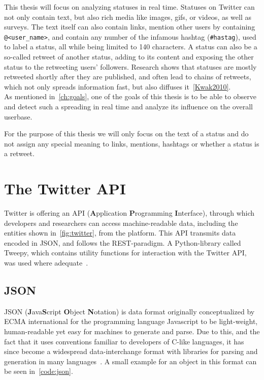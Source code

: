 \par
This thesis will focus on analyzing statuses in real time.
Statuses on Twitter can not only contain text, but also rich media like images, gifs, or videos, as well as surveys.
The text itself can also contain links, mention other users by containing \texttt{@<user_name>},
and contain any number of the infamous hashtag (\texttt{#hastag}), used to label a status, all while being limited to 140 characters.
A status can also be a so-called retweet of another status, adding to its content and exposing the other status to the retweeting users' followers.
Research shows that statuses are mostly retweeted shortly after they are published, and often lead to chains of retweets,
which not only spreads information fast, but also diffuses it~\ref{Kwak2010}.\\
As mentioned in~\ref{ch:goals}, one of the goals of this thesis is to be able to observe and detect such a spreading in real time
and analyze its influence on the overall userbase.
\par
For the purpose of this thesis we will only focus on the text of a status and do not assign any special meaning to links,
mentions, hashtags or whether a status is a retweet.\\


\section{The Twitter API}
\label{sec:theApi}

Twitter is offering an API (\textbf{A}pplication \textbf{P}rogramming \textbf{I}nterface),
through which developers and researchers can access machine-readable data,
including the entities shown in~\ref{fig:twitter}, from the platform.
This API transmits data encoded in JSON, and follows the REST-paradigm.
A Python-library called Tweepy, which contains utility functions for interaction with the Twitter API, was used where adequate~\cite{tweepyDocs}.

\subsection{JSON}
\label{subsec:json}

JSON (\textbf{J}ava\textbf{S}cript \textbf{O}bject \textbf{N}otation) is data format originally conceptualized by ECMA international
for the programming language Javascript to be light-weight, human-readable yet easy for machines to generate and parse.
Due to this, and the fact that it uses conventions familiar to developers of C-like languages,
it has since become a widespread data-interchange format with libraries for parsing and generation in many languages~\cite{jsonDocs}.
A small example for an object in this format can be seen in~\ref{code:json}.


